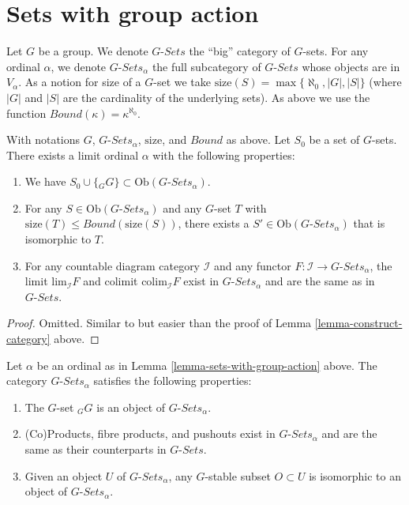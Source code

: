 \section{Sets with group action}
\label{section-sets-with-group-action}

\noindent
Let $G$ be a group. We denote $G\textit{-Sets}$ the ``big'' category
of $G$-sets. For any ordinal $\alpha$, we denote
$G\textit{-Sets}_\alpha$ the full subcategory of $G\textit{-Sets}$
whose objects are in $V_\alpha$. As a notion for size of a $G$-set
we take $\text{size}(S) = \max\{\aleph_0, |G|, |S|\}$ (where $|G|$ and
$|S|$ are the cardinality of the underlying sets). As above we use the function
$Bound(\kappa) = \kappa^{\aleph_0}$.

\begin{lemma}
\label{lemma-sets-with-group-action}
With notations $G$, $G\textit{-Sets}_\alpha$, $\text{size}$,
and $Bound$ as above. Let $S_0$ be a set of $G$-sets.
There exists a limit ordinal $\alpha$ with the following properties:
\begin{enumerate}
\item We have $S_0 \cup \{{}_GG\} \subset \text{Ob}(G\textit{-Sets}_\alpha)$.
\item For any $S \in \text{Ob}(G\textit{-Sets}_\alpha)$ and any
$G$-set $T$ with $\text{size}(T) \leq Bound(\text{size}(S))$,
there exists a $S' \in \text{Ob}(G\textit{-Sets}_\alpha)$
that is isomorphic to $T$.
\item For any countable diagram category $\mathcal{I}$ and
any functor $F : \mathcal{I} \to G\textit{-Sets}_\alpha$, the
limit $\text{lim}_{\mathcal{I}} F$ and colimit
$\text{colim}_\mathcal{I} F$ exist in $G\textit{-Sets}_\alpha$
and are the same as in $G\textit{-Sets}$.
\end{enumerate}
\end{lemma}

\begin{proof}
Omitted. Similar to but easier than the proof of
Lemma \ref{lemma-construct-category} above.
\end{proof}

\begin{lemma}
\label{lemma-what-is-in-it-G-sets}
Let $\alpha$ be an ordinal as in Lemma \ref{lemma-sets-with-group-action}
above. The category $G\textit{-Sets}_\alpha$ satisfies the following
properties:
\begin{enumerate}
\item The $G$-set ${}_GG$ is an object of $G\textit{-Sets}_\alpha$.
\item (Co)Products, fibre products, and pushouts
exist in $G\textit{-Sets}_\alpha$
and are the same as their counterparts in $G\textit{-Sets}$.
\item Given an object $U$ of $G\textit{-Sets}_\alpha$,
any $G$-stable subset $O \subset U$  is isomorphic to an object
of $G\textit{-Sets}_\alpha$.
\end{enumerate}
\end{lemma}


